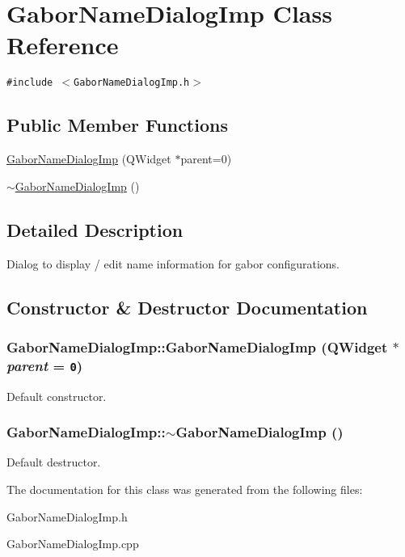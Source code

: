 \hypertarget{classGaborNameDialogImp}{
\section{GaborNameDialogImp Class Reference}
\label{classGaborNameDialogImp}
}
{\tt \#include $<$GaborNameDialogImp.h$>$}

\subsection*{Public Member Functions}
\begin{CompactItemize}
\item 
\hyperlink{classGaborNameDialogImp_f3fb0dd0cdfa412a59b0805388f74b8a}{GaborNameDialogImp} (QWidget $\ast$parent=0)
\item 
\hyperlink{classGaborNameDialogImp_f3f71960f018fb81df3a934650513aa1}{$\sim$GaborNameDialogImp} ()
\end{CompactItemize}


\subsection{Detailed Description}
Dialog to display / edit name information for gabor configurations. 

\subsection{Constructor \& Destructor Documentation}
\hypertarget{classGaborNameDialogImp_f3fb0dd0cdfa412a59b0805388f74b8a}{
\subsubsection[{GaborNameDialogImp}]{\setlength{\rightskip}{0pt plus 5cm}GaborNameDialogImp::GaborNameDialogImp (QWidget $\ast$ {\em parent} = {\tt 0})}}
\label{classGaborNameDialogImp_f3fb0dd0cdfa412a59b0805388f74b8a}


Default constructor. \hypertarget{classGaborNameDialogImp_f3f71960f018fb81df3a934650513aa1}{
\subsubsection[{$\sim$GaborNameDialogImp}]{\setlength{\rightskip}{0pt plus 5cm}GaborNameDialogImp::$\sim$GaborNameDialogImp ()}}
\label{classGaborNameDialogImp_f3f71960f018fb81df3a934650513aa1}


Default destructor. 

The documentation for this class was generated from the following files:\begin{CompactItemize}
\item 
GaborNameDialogImp.h\item 
GaborNameDialogImp.cpp\end{CompactItemize}
